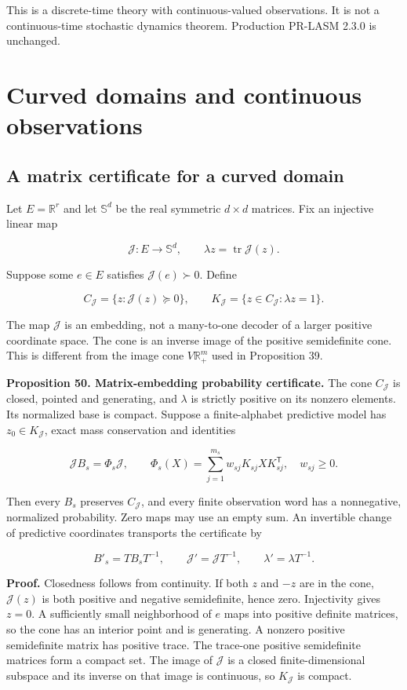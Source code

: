 This is a discrete-time theory with continuous-valued observations. It
is not a continuous-time stochastic dynamics theorem. Production PR-LASM
2.3.0 is unchanged.


\chapter{Curved domains and continuous observations}\label{LSM:book:chapter-35}
\section{A matrix certificate for a curved domain}\label{LSM:a-matrix-certificate-for-a-curved-domain}

Let \(E=\mathbb R^r\) and let \(\mathbb S^d\) be the real symmetric
\(d\times d\) matrices. Fix an injective linear map

\[
\mathcal J:E\longrightarrow\mathbb S^d,
\qquad \lambda z=\operatorname{tr}\mathcal J(z).
\]

Suppose some \(e\in E\) satisfies \(\mathcal J(e)\succ0\). Define

\[
C_{\mathcal J}=\{z:\mathcal J(z)\succeq0\},
\qquad K_{\mathcal J}=\{z\in C_{\mathcal J}:\lambda z=1\}.
\]

The map \(\mathcal J\) is an embedding, not a many-to-one decoder of a
larger positive coordinate space. The cone is an inverse image of the
positive semidefinite cone. This is different from the image cone
\(V\mathbb R_+^m\) used in Proposition 39.

\textbf{Proposition 50. Matrix-embedding probability certificate.} The
cone \(C_{\mathcal J}\) is closed, pointed and generating, and
\(\lambda\) is strictly positive on its nonzero elements. Its normalized
base is compact. Suppose a finite-alphabet predictive model has
\(z_0\in K_{\mathcal J}\), exact mass conservation and identities

\[
\boxed{\mathcal J B_s=\Phi_s\mathcal J,}
\qquad
\Phi_s(X)=\sum_{j=1}^{m_s} w_{sj}K_{sj}XK_{sj}^{\mathsf T},
\quad w_{sj}\geq0.
\]

Then every \(B_s\) preserves \(C_{\mathcal J}\), and every finite
observation word has a nonnegative, normalized probability. Zero maps
may use an empty sum. An invertible change of predictive coordinates
transports the certificate by

\[
B'_s=TB_sT^{-1},\qquad
\mathcal J'=\mathcal JT^{-1},\qquad
\lambda'=\lambda T^{-1}.
\]

\textbf{Proof.} Closedness follows from continuity. If both \(z\) and
\(-z\) are in the cone, \(\mathcal J(z)\) is both positive and negative
semidefinite, hence zero. Injectivity gives \(z=0\). A sufficiently
small neighborhood of \(e\) maps into positive definite matrices, so the
cone has an interior point and is generating. A nonzero positive
semidefinite matrix has positive trace. The trace-one positive
semidefinite matrices form a compact set. The image of \(\mathcal J\) is
a closed finite-dimensional subspace and its inverse on that image is
continuous, so \(K_{\mathcal J}\) is compact.

